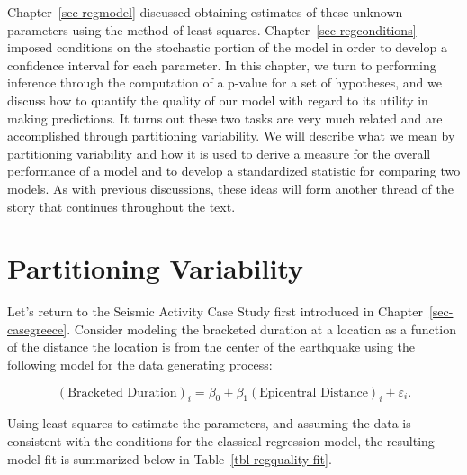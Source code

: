 \documentclass[
  letterpaper,
  DIV=11,
  numbers=noendperiod]{scrreprt}
\theoremstyle{definition}
\theoremstyle{definition}
\theoremstyle{plain}
\theoremstyle{remark}
\begin{document}
Chapter~\ref{sec-regmodel} discussed obtaining estimates of these
unknown parameters using the method of least squares.
Chapter~\ref{sec-regconditions} imposed conditions on the stochastic
portion of the model in order to develop a confidence interval for each
parameter. In this chapter, we turn to performing inference through the
computation of a p-value for a set of hypotheses, and we discuss how to
quantify the quality of our model with regard to its utility in making
predictions. It turns out these two tasks are very much related and are
accomplished through partitioning variability. We will describe what we
mean by partitioning variability and how it is used to derive a measure
for the overall performance of a model and to develop a standardized
statistic for comparing two models. As with previous discussions, these
ideas will form another thread of the story that continues throughout
the text.

\section{Partitioning Variability}\label{partitioning-variability}

Let's return to the Seismic Activity Case Study first introduced in
Chapter~\ref{sec-casegreece}. Consider modeling the bracketed duration
at a location as a function of the distance the location is from the
center of the earthquake using the following model for the data
generating process:

\[(\text{Bracketed Duration})_i = \beta_0 + \beta_1(\text{Epicentral Distance})_i + \varepsilon_i.\]

Using least squares to estimate the parameters, and assuming the data is
consistent with the conditions for the classical regression model, the
resulting model fit is summarized below in
Table~\ref{tbl-regquality-fit}.

\begin{table}

\caption{\label{tbl-regquality-fit}Summary of the model fit explaining
the bracketed duration as a function of epicentral distance.}


\end{table}%
\end{document}
